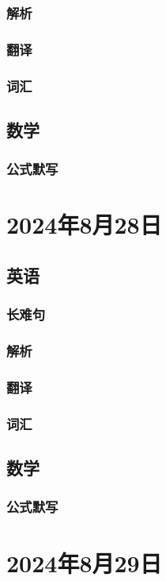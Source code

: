 \documentclass[UTF8]{ctexart}
\begin{document}
\subsubsection{解析}
\subsubsection{翻译}
\subsubsection{词汇}
\subsection{数学}
\subsubsection{公式默写}
\begin{multicols}{2}
\end{multicols}
\section{2024年8月28日}
\subsection{英语}
\subsubsection{长难句}
\subsubsection{解析}
\subsubsection{翻译}
\subsubsection{词汇}
\subsection{数学}
\subsubsection{公式默写}
\begin{multicols}{2}
\end{multicols}
\section{2024年8月29日}
\end{document}
